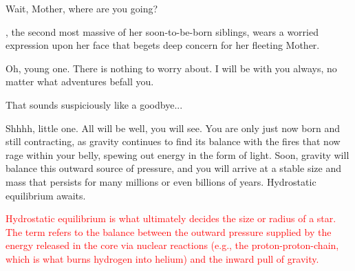\documentclass[main.tex]{subfiles}
\begin{document}
\par \Maia Wait, Mother, where are you going?  

\par \nar \rmmaia, the second most massive of her soon-to-be-born siblings, wears a worried expression upon her face that begets deep concern for her fleeting Mother.  





\par \Pleione Oh, young one.  There is nothing to worry about.  I will be with you always, no matter what adventures befall you.  

\par \Maia That sounds suspiciously like a goodbye...

\par \Pleione Shhhh, little one.  All will be well, you will see.  You are only just now born and still contracting, as gravity continues to find its balance with the fires that now rage within your belly, spewing out energy in the form of light.  Soon, gravity will balance this outward source of pressure, and you will arrive at a stable size and mass that persists for many millions or even billions of years.  Hydrostatic equilibrium awaits.

\begin{tcolorbox}[sharp corners, colback=red!30, colframe=red!80!blue, title=Hydrostatic Equilibrium]
\par \textcolor{red} {Hydrostatic equilibrium is what ultimately decides the size or radius of a star.  The term refers to the balance between the outward pressure supplied by the energy released in the core via nuclear reactions (e.g., the proton-proton-chain, which is what burns hydrogen into helium) and the inward pull of gravity.}
\end{tcolorbox}
\end{document}
